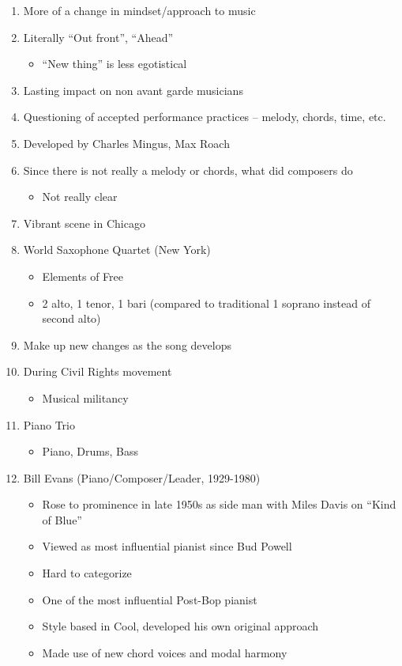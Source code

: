 \documentclass[]{article}
\providecommand{\tightlist}{%
  \setlength{\itemsep}{0pt}\setlength{\parskip}{0pt}}
\begin{document}
\begin{enumerate}
\def\labelenumi{\arabic{enumi}.}
\tightlist
\item
  More of a change in mindset/approach to music
\item
  Literally ``Out front'', ``Ahead''

  \begin{itemize}
  \tightlist
  \item
    ``New thing'' is less egotistical
  \end{itemize}
\item
  Lasting impact on non avant garde musicians
\item
  Questioning of accepted performance practices -- melody, chords, time,
  etc.
\item
  Developed by Charles Mingus, Max Roach
\item
  Since there is not really a melody or chords, what did composers do

  \begin{itemize}
  \tightlist
  \item
    Not really clear
  \end{itemize}
\item
  Vibrant scene in Chicago
\item
  World Saxophone Quartet (New York)

  \begin{itemize}
  \tightlist
  \item
    Elements of Free
  \item
    2 alto, 1 tenor, 1 bari (compared to traditional 1 soprano instead
    of second alto)
  \end{itemize}
\item
  Make up new changes as the song develops
\item
  During Civil Rights movement

  \begin{itemize}
  \tightlist
  \item
    Musical militancy
  \end{itemize}
\item
  Piano Trio

  \begin{itemize}
  \tightlist
  \item
    Piano, Drums, Bass
  \end{itemize}
\item
  Bill Evans (Piano/Composer/Leader, 1929-1980)

  \begin{itemize}
  \tightlist
  \item
    Rose to prominence in late 1950s as side man with Miles Davis on
    ``Kind of Blue''
  \item
    Viewed as most influential pianist since Bud Powell
  \item
    Hard to categorize
  \item
    One of the most influential Post-Bop pianist
  \item
    Style based in Cool, developed his own original approach
  \item
    Made use of new chord voices and modal harmony


\end{itemize}
\end{enumerate}
\end{document}
